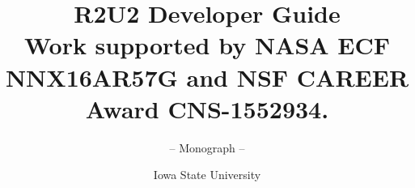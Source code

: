 \documentclass[envcountsame,envcountchap]{svmono}
\begin{document}
\author{Iowa State University}
\title{R2U2 Developer Guide\\
{\small Work supported by NASA ECF NNX16AR57G and NSF CAREER Award CNS-1552934.}}
\subtitle{-- Monograph --}
\maketitle

\frontmatter%


\tableofcontents


\mainmatter%
% 
% 
%

\backmatter%




\printindex

\end{document}
